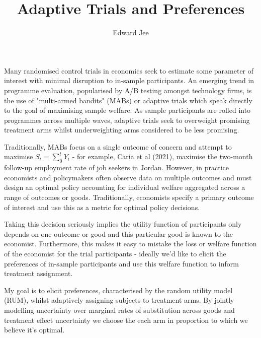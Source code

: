\documentclass{article}
\title{Adaptive Trials and Preferences}
\author{Edward Jee}
\begin{document}
\maketitle


Many randomised control trials in economics seek to estimate some parameter of 
interest with minimal disruption to in-sample participants.  An emerging trend in programme 
evaluation, popularised by A/B testing amongst technology firms, is the use of 
"multi-armed bandits" (MABs) or adaptive trials which speak directly to the goal 
of maximising sample welfare. As sample participants are rolled into programmes 
across multiple waves, adaptive trials seek to overweight promising treatment 
arms whilst underweighting arms considered to be less promising.



Traditionally, MABs focus on a single outcome of concern and attempt to maximise 
$S_t = \sum^t_{0}Y_t$ - for example, Caria et al (2021), maximise the 
two-month follow-up employment rate of job seekers in Jordan. However, in 
practice economists and policymakers often observe data on multiple outcomes and 
must design an optimal policy accounting for individual welfare aggregated across 
a range of outcomes or goods. Traditionally, economists specify a primary outcome 
of interest and use this as a metric for optimal policy decisions. 

    
Taking this decision seriously 
implies the utility function of participants only depends on one outcome or good 
and this particular good is known to the economist. Furthermore, this makes it 
easy to mistake the loss or welfare function of the economist for the trial 
participants - ideally we'd like to elicit the preferences of in-sample participants 
and use this welfare function to inform treatment assignment. 


My goal is  to elicit preferences, characterised by the 
random utility model (RUM), whilst adaptively assigning subjects 
to treatment arms. By jointly modelling uncertainty over marginal rates of substitution 
across goods and treatment effect uncertainty we choose the each arm in proportion 
to which we believe it's optimal.
\end{document}
